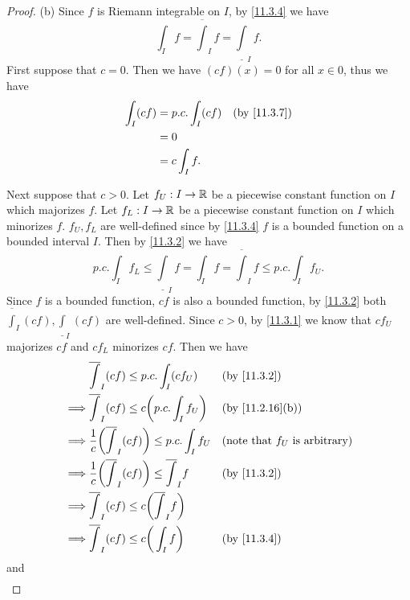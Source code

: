 \begin{proof}{(b)}
  Since \(f\) is Riemann integrable on \(I\), by \cref{11.3.4} we have
  \[
    \int_I f = \overline{\int}_I f = \underline{\int}_I f.
  \]
  First suppose that \(c = 0\).
  Then we have \((cf)(x) = 0\) for all \(x \in 0\), thus we have
  \begin{align*}
    \int_I (cf) & = p.c. \int_I (cf) &  & \text{(by \cref{11.3.7})} \\
                & = 0                                               \\
                & = c \int_I f.
  \end{align*}

  Next suppose that \(c > 0\).
  Let \(f_U : I \to \mathbb{R}\) be a piecewise constant function on \(I\) which majorizes \(f\).
  Let \(f_L : I \to \mathbb{R}\) be a piecewise constant function on \(I\) which minorizes \(f\).
  \(f_U, f_L\) are well-defined since by \cref{11.3.4} \(f\) is a bounded function on a bounded interval \(I\).
  Then by \cref{11.3.2} we have
  \[
    p.c. \int_I f_L \leq \underline{\int}_I f = \int_I f = \overline{\int}_I f \leq p.c. \int_I f_U.
  \]
  Since \(f\) is a bounded function, \(cf\) is also a bounded function, by \cref{11.3.2} both \(\overline{\int}_I (cf), \underline{\int}_I (cf)\) are well-defined.
  Since \(c > 0\), by \cref{11.3.1} we know that \(c f_U\) majorizes \(c f\) and \(c f_L\) minorizes \(c f\).
  Then we have
  \begin{align*}
             & \overline{\int}_I (cf) \leq p.c. \int_I (c f_U)                          &  & \text{(by \cref{11.3.2})}               \\
    \implies & \overline{\int}_I (cf) \leq c \bigg(p.c. \int_I f_U\bigg)                &  & \text{(by \cref{11.2.16}(b))}           \\
    \implies & \dfrac{1}{c} \bigg(\overline{\int}_I (cf)\bigg) \leq p.c. \int_I f_U     &  & \text{(note that \(f_U\) is arbitrary)} \\
    \implies & \dfrac{1}{c} \bigg(\overline{\int}_I (cf)\bigg) \leq \overline{\int}_I f &  & \text{(by \cref{11.3.2})}               \\
    \implies & \overline{\int}_I (cf) \leq c\bigg(\overline{\int}_I f\bigg)                                                          \\
    \implies & \overline{\int}_I (cf) \leq c\bigg(\int_I f\bigg)                        &  & \text{(by \cref{11.3.4})}
  \end{align*}
  and
  \begin{align*}

\end{align*}
\end{proof}
